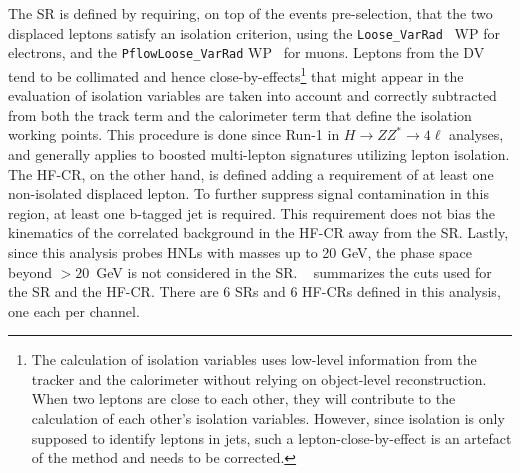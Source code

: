 The SR is defined by requiring, on top of the events pre-selection, that the two displaced leptons satisfy an isolation criterion, using the \texttt{Loose\_VarRad}~\cite{EGAM-2018-01} WP for electrons, and the \texttt{PflowLoose\_VarRad} WP~\cite{MUON-2018-03} for muons. Leptons from the DV tend to be collimated and hence close-by-effects\footnote{The calculation of isolation variables uses low-level information from the tracker and the calorimeter without relying on object-level reconstruction. When two leptons are close to each other, they will contribute to the calculation of each other's isolation variables. However, since isolation is only supposed to identify leptons in jets, such a lepton-close-by-effect is an artefact of the method and needs to be corrected.} that might appear in the evaluation of isolation variables are taken into account and correctly subtracted from both the track term and the calorimeter term that define the isolation working points. This procedure is done since Run-1 in $H\to ZZ^*\to 4\ell$ analyses, and generally applies to boosted multi-lepton signatures utilizing lepton isolation. The HF-CR, on the other hand, is defined adding a requirement of at least one non-isolated displaced lepton. To further suppress signal contamination in this region, at least one b-tagged jet is required. This requirement does not bias the kinematics of the correlated background in the HF-CR away from the SR. Lastly, since this analysis probes HNLs with masses up to 20 GeV, the phase space beyond \mhnl$>20$~GeV is not considered in the SR. ~ summarizes the cuts used for the SR and the HF-CR. There are 6 SRs and 6 HF-CRs defined in this analysis, one each per channel.

